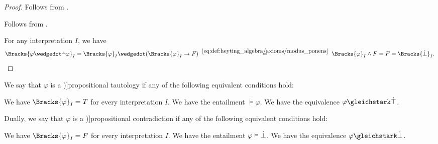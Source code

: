 \begin{proof}
   Follows from .

   Follows from .

   For any interpretation \( I \), we have
  \begin{equation*}
    \Bracks{ \varphi \synwedge \synneg \varphi }_I
    =
    \Bracks{ \varphi }_I \synwedge (\Bracks{ \varphi }_I \rightarrow F)
    \reloset {\eqref{eq:def:heyting_algebra/axioms/modus_ponens}} =
    \Bracks{ \varphi }_I \wedge F
    =
    F
    =
    \Bracks{\synbot}_I.
  \end{equation*}
\end{proof}

\begin{definition}\label{def:propositional_tautology}
  We say that \( \varphi \) is a \term[ru=пропозициональная тавтология (\cite[44]{КолмогоровДрагалин2006})]{propositional tautology} if any of the following equivalent conditions hold:
  \begin{thmenum}
     We have \( \Bracks{\varphi}_I = T \) for every interpretation \( I \).
     We have the entailment \( \vDash \varphi \).
     We have the equivalence \( \varphi \gleichstark \syntop \).
  \end{thmenum}
\end{definition}

\begin{definition}\label{def:propositional_contradiction}
  Dually, we say that \( \varphi \) is a \term[en=contradictory (formula) (\cite[28]{Kleene2002Logic})]{propositional contradiction} if any of the following equivalent conditions hold:
  \begin{thmenum}
     We have \( \Bracks{\varphi}_I = F \) for every interpretation \( I \).
     We have the entailment \( \varphi \vDash \dot\bot \).
     We have the equivalence \( \varphi \gleichstark \synbot \).
  \end{thmenum}
\end{definition}

